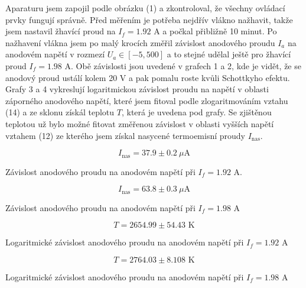 \documentclass[a4paper,11pt]{article}
\begin{document}
Aparaturu jsem zapojil podle obrázku (1) a zkontroloval, že všechny ovládací prvky fungují správně. Před měřením je potřeba nejdřív vlákno nažhavit, takže jsem nastavil žhavící proud na $ I_f = 1.92 $ A a počkal přibližně 10 minut. Po nažhavení vlákna jsem po malý krocích změřil závislost anodového proudu $ I_a $  na anodovém napětí v rozmezí $ U_a \in [-5, 500] $ a to stejné udělal ještě pro žhavící proud $ I_f = 1.98 $ A. Obě závislosti jsou uvedené v grafech 1 a 2, kde je vidět, že se anodový proud ustálí kolem 20 V a pak pomalu roste kvůli Schottkyho efektu. Grafy 3 a 4 vykreslují logaritmickou závislost proudu na napětí v oblasti záporného anodového napětí, které jsem fitoval podle zlogaritmováním vztahu (14) a ze sklonu získál teplotu $ T $, která je uvedena pod grafy. Se zjištěnou teplotou už bylo možné fitovat změřenou závislost v oblasti vyšších napětí vztahem (12) ze kterého jsem získal nasycené termoemisní proudy $ I_{\text{nas}} $.

\begin{table}[h]
    \captionsetup{type=graph}
    \begin{minipage}{.45\linewidth}
        \centering
        
        \[ I_{\text{nas}} = 37.9 \pm 0.2 \ \mu \text{A} \]
        \caption{ Závislost anodového proudu na anodovém napětí při $ I_f = 1.92 $ A. }
    \end{minipage}
    \hfill
    \begin{minipage}{.45\linewidth}
        \centering
        
        \[ I_{\text{nas}} = 63.8 \pm 0.3 \ \mu \text{A} \]
        \caption{Závislost anodového proudu na anodovém napětí při $ I_f = 1.98 $ A }
    \end{minipage}
\end{table}

\vspace{-30pt}

\begin{table}[h]
    \captionsetup{type=graph}
    \begin{minipage}{.45\linewidth}
        \centering
        
        \[ T = 2654.99 \pm 54.43 \text{ K} \]
        \caption{ Logaritmické závislost anodového proudu na anodovém napětí při $ I_f = 1.92 $ A }
    \end{minipage}
    \hfill
    \begin{minipage}{.45\linewidth}
        \centering
        
        \[ T = 2764.03 \pm 8.108 \text{ K} \]

        \caption{Logaritmické závislost anodového proudu na anodovém napětí při $ I_f = 1.98 $ A }
    \end{minipage}
\end{table}
\end{document}
